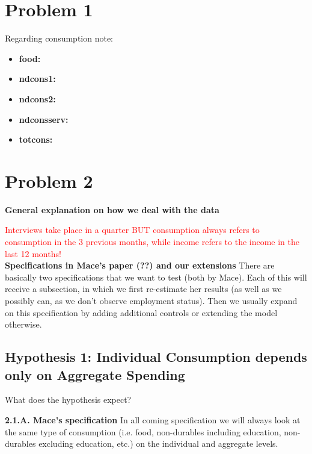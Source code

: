 \documentclass[12pt,a4paper]{article}
\begin{document}
\newpage


\section*{Problem 1}

Regarding consumption note:
\begin{itemize}
    \item \textbf{food:} 
    \item \textbf{ndcons1:} 
    \item \textbf{ndcons2:} 
    \item \textbf{ndconsserv:} 
    \item \textbf{totcons:} 
\end{itemize}


\section*{Problem 2}

\textbf{General explanation on how we deal with the data}

\textcolor{red}{Interviews take place in a quarter BUT consumption always refers to consumption in the 3 previous months, while income refers to the income in the last 12 months!} \\

\textbf{Specifications in Mace's paper (??) and our extensions}
There are basically two specifications that we want to test (both by Mace). Each of this will receive a subsection, in which we first re-estimate her results (as well as we possibly can, as we don't observe employment status). Then we usually expand on this specification by adding additional controls or extending the model otherwise. 

\subsection*{Hypothesis 1: Individual Consumption depends only on Aggregate Spending}
What does the hypothesis expect? 

\textbf{2.1.A. Mace's specification}
In all coming specification we will always look at the same type of consumption (i.e. food, non-durables including education, non-durables excluding education, etc.) on the individual and aggregate levels.
\end{document}
